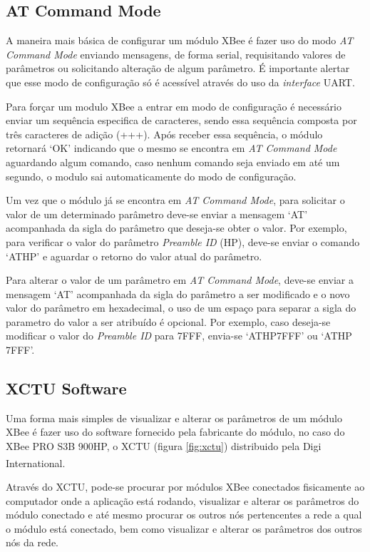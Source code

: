 \subsection{AT Command Mode}

A maneira mais básica de configurar um módulo XBee é fazer uso do modo \emph{AT Command Mode} enviando mensagens, de forma serial, requisitando valores de parâmetros ou solicitando alteração de algum parâmetro. É importante alertar que esse modo de configuração só é acessível através do uso da \emph{interface} UART.

Para forçar um modulo XBee a entrar em modo de configuração é necessário enviar um sequência especifica de caracteres, sendo essa sequência composta por três caracteres de adição (+++). Após receber essa sequência, o módulo retornará `OK' indicando que o mesmo se encontra em \emph{AT Command Mode} aguardando algum comando, caso nenhum comando seja enviado em até um segundo, o modulo sai automaticamente do modo de configuração.

Um vez que o módulo já se encontra em \emph{AT Command Mode}, para solicitar o valor de um determinado parâmetro deve-se enviar a mensagem `AT' acompanhada da sigla do parâmetro que deseja-se obter o valor. Por exemplo, para verificar o valor do parâmetro \emph{Preamble ID} (HP), deve-se enviar o comando `ATHP' e aguardar o retorno do valor atual do parâmetro.

Para alterar o valor de um parâmetro em \emph{AT Command Mode}, deve-se enviar a mensagem `AT' acompanhada da sigla do parâmetro a ser modificado e o novo valor do parâmetro em hexadecimal, o uso de um espaço para separar a sigla do parametro do valor a ser atribuído é opcional. Por exemplo, caso deseja-se modificar o valor do \emph{Preamble ID} para 7FFF, envia-se `ATHP7FFF' ou `ATHP 7FFF'.

\subsection{XCTU Software}

Uma forma mais simples de visualizar e alterar os parâmetros de um módulo XBee é fazer uso do software fornecido pela fabricante do módulo, no caso do XBee PRO S3B 900HP, o XCTU (figura \ref{fig:xctu}) distribuido pela Digi International\textsuperscript{\texttrademark}.

Através do XCTU, pode-se procurar por módulos XBee conectados fisicamente ao computador onde a aplicação está rodando, visualizar e alterar os parâmetros do módulo conectado e até mesmo procurar os outros nós pertencentes a rede a qual o módulo está conectado, bem como visualizar e alterar os parâmetros dos outros nós da rede. 

